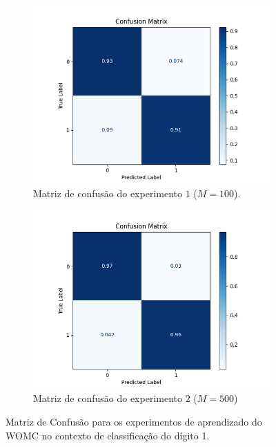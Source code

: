 \begin{figure}
  \centering

  \begin{subfigure}{0.49\textwidth}
    \centering
    \includegraphics[width=1.1\textwidth]{figuras/conf_matrix_100.png}
    \caption{Matriz de confusão do experimento $1$ ($M=100$).\label{fig:subfig:conf1}}
  \end{subfigure}
  \begin{subfigure}{0.49\textwidth}
    \centering
      \includegraphics[width=1.1\textwidth]{figuras/conf_matrix.png}
    \caption{Matriz de confusão do experimento $2$ ($M=500$)\label{fig:subfig:conf2}}
  \end{subfigure}

  \caption{Matriz de Confusão para os experimentos de aprendizado do WOMC no contexto de classificação do dígito 1.\label{fig:confusion_matrix}}
\end{figure}

